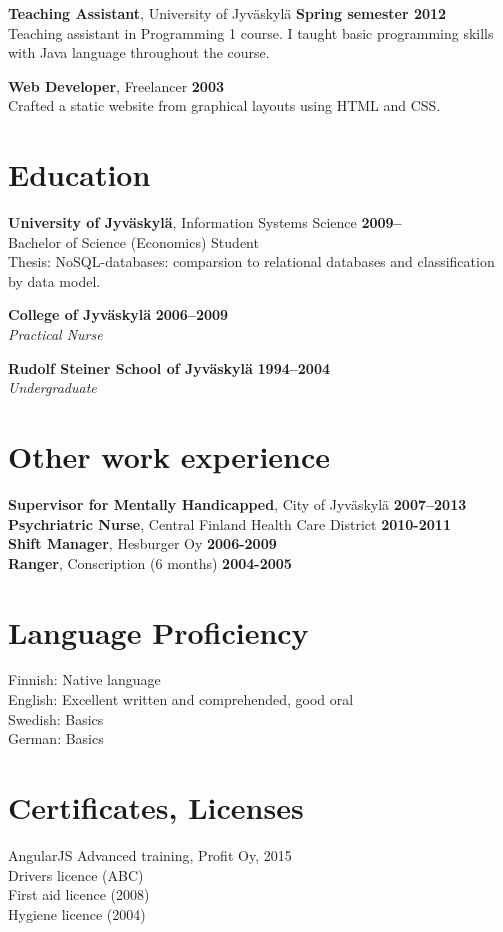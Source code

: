 \documentclass[margin,line]{resume}
\begin{document}
\begin{resume}
\textbf{Teaching Assistant}, University of Jyväskylä  
\hfill\textbf{Spring semester 2012}\\
Teaching assistant in Programming 1 course. I taught basic programming skills with Java language throughout the course.

\textbf{Web Developer}, Freelancer
\hfill\textbf{2003}\\
Crafted a static website from graphical layouts using HTML and CSS.

\section{\mysidestyle Education}

\textbf{University of Jyväskylä}, Information Systems Science \hfill \textbf{2009--} \\
Bachelor of Science (Economics) Student \\
Thesis: NoSQL-databases: comparsion to relational databases and classification by data model.

\textbf{College of Jyväskylä} \hfill \textbf{ 2006--2009}\\
\textsl{Practical Nurse} 

\textbf{Rudolf Steiner School of Jyväskylä} \hfill \textbf{1994--2004}\\
\textsl{Undergraduate} 

\section{\mysidestyle Other work experience}
\textbf{Supervisor for Mentally Handicapped}, City of Jyväskylä \hfill\textbf{2007--2013}\\
\textbf{Psychriatric Nurse}, Central Finland Health Care District
\hfill\textbf{2010-2011}\\
\textbf{Shift Manager}, Hesburger Oy \hfill\textbf{2006-2009}\\
\textbf{Ranger}, Conscription (6 months) \hfill\textbf{2004-2005} 
\pagebreak 
  
\section{\mysidestyle Language Proficiency}
Finnish: Native language \\ 
English: Excellent written and comprehended, good oral \\ 
Swedish: Basics \\ 
German: Basics 

\section{\mysidestyle Certificates, Licenses} 
AngularJS Advanced training, Profit Oy, 2015 \\
Drivers licence (ABC) \\
First aid licence (2008) \\
Hygiene licence (2004) \\

\end{resume}
\end{document}
